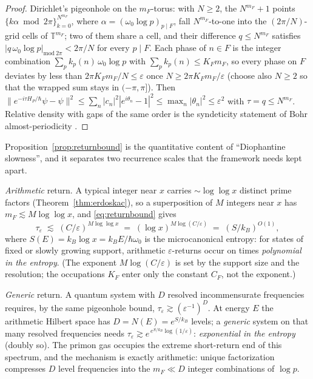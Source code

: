 \begin{proof}
Dirichlet's pigeonhole on the $m_{F}$-torus: with $N\geq2$, the $N^{m_{F}}+1$ points
$\{k\alpha\bmod 2\pi\}_{k=0}^{N^{m_{F}}}$, where
$\alpha=(\omega_{0}\log p)_{p\mid F}$, fall $N^{m_{F}}$-to-one into the $(2\pi/N)$-grid cells
of $\mathbb{T}^{m_{F}}$; two of them share a cell, and their difference $q\leq N^{m_{F}}$
satisfies $|q\,\omega_{0}\log p|_{\mathrm{mod}\ 2\pi}<2\pi/N$ for every $p\mid F$. Each phase of
$n\in F$ is the integer combination $\sum_{p}k_{p}(n)\,\omega_{0}\log p$ with
$\sum_{p}k_{p}(n)\leq K_{F}m_{F}$, so every phase on $F$ deviates by less than
$2\pi K_{F}m_{F}/N\leq\varepsilon$ once $N\geq2\pi K_{F}m_{F}/\varepsilon$ (choose also
$N\geq2$ so that the wrapped sum stays in $(-\pi,\pi]$). Then
$\|e^{-i\tau H_{P}/\hbar}\psi-\psi\|^{2}\leq\sum_{n}|c_{n}|^{2}|e^{i\theta_{n}}-1|^{2}
\leq\max_{n}|\theta_{n}|^{2}\leq\varepsilon^{2}$ with $\tau=q\leq N^{m_{F}}$. Relative
density with gaps of the same order is the syndeticity statement of Bohr almost-periodicity
\cite{besicovitch1932}.
\end{proof}

Proposition~\ref{prop:returnbound} is the quantitative content of ``Diophantine slowness'',
and it separates two recurrence scales that the framework needs kept apart.

\emph{Arithmetic} return. A typical integer near $x$ carries $\sim\log\log x$ distinct prime
factors (Theorem~\ref{thm:erdoskac}), so a superposition of $M$ integers near $x$ has
$m_{F}\lesssim M\log\log x$, and \eqref{eq:returnbound} gives
\begin{equation}\label{eq:arithreturn}
\tau_{\varepsilon}\;\lesssim\;(C/\varepsilon)^{M\log\log x}
\;=\;(\log x)^{M\log(C/\varepsilon)}
\;=\;(S/k_{B})^{O(1)},
\end{equation}
where $S(E)=k_{B}\log x=k_{B}E/\hbar\omega_{0}$ is the microcanonical entropy: for states
of fixed or slowly growing support, arithmetic $\varepsilon$-returns occur on times
\emph{polynomial in the entropy}. (The exponent $M\log(C/\varepsilon)$ is set by the support
size and the resolution; the occupations $K_{F}$ enter only the constant $C_{F}$, not the
exponent.)

\emph{Generic} return. A quantum system with $D$ resolved incommensurate frequencies
requires, by the same pigeonhole bound, $\tau_{\varepsilon}\gtrsim(\varepsilon^{-1})^{D}$. At
energy $E$ the arithmetic Hilbert space has $D=N(E)=e^{S/k_{B}}$ levels; a \emph{generic}
system on that many resolved frequencies needs
$\tau_{\varepsilon}\gtrsim e^{\,e^{S/k_{B}}\log(1/\varepsilon)}$: \emph{exponential in the
entropy} (doubly so). The primon gas occupies the extreme short-return end of this spectrum,
and the mechanism is exactly arithmetic: unique factorization compresses $D$ level
frequencies into the $m_{F}\ll D$ integer combinations of $\log p$.

